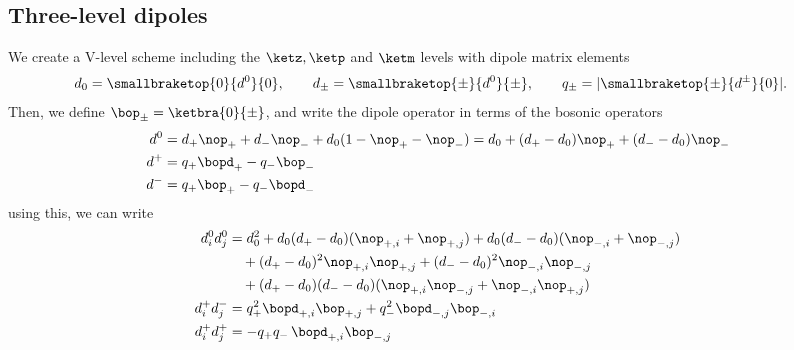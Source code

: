 \subsection{Three-level dipoles}
We create a \textsf{V}-level scheme including the $\ketz, \ketp$ and $\ketm$ levels with
dipole matrix elements
\begin{align}
    d_0 = \smallbraketop{0}{d^0}{0}, \qquad
    d_\pm = \smallbraketop{\pm}{d^0}{\pm}, \qquad
    q_\pm &= |\smallbraketop{\pm}{d^\pm}{0}|.
\end{align}
%
%
Then, we define $\bop_\pm=\ketbra{0}{{\pm}}$, and write the dipole operator in terms of the bosonic operators
\begin{align}
    d^0 &= d_+ \nop_+ + d_- \nop_- + d_0 (1-\nop_+-\nop_-) = d_0 + (d_+-d_0) \nop_+ + (d_--d_0) \nop_- \\
    d^+ &= q_+ \bopd_+ - q_- \bop_- \\
    d^- &= q_+ \bop_+  - q_- \bopd_-
\end{align}
using this, we can write
\begin{align}
    d^0_i d^0_j &= d_0^2 + d_0(d_+-d_0) (\nop_{+,i}+\nop_{+,j}) + d_0(d_--d_0) (\nop_{-,i}+\nop_{-,j}) \\
                &\quad + (d_+ - d_0)^2 \nop_{+,i} \nop_{+,j} + (d_- - d_0)^2 \nop_{-,i} \nop_{-,j} \\
                &\quad + (d_+ - d_0)(d_- - d_0) (\nop_{+,i} \nop_{-,j} + \nop_{-,i} \nop_{+,j}) \\
    d^+_i d^-_j &= q_+^2 \bopd_{+,i} \bop_{+,j} + q_-^2 \bopd_{-,j} \bop_{-,i} \\
    d^+_i d^+_j &= - q_+q_- \, \bopd_{+,i} \bop_{-,j}
\end{align}
